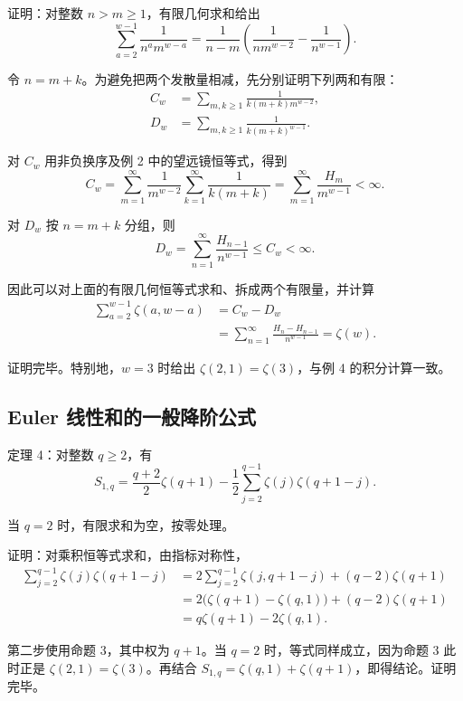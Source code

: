 \documentclass[11pt,a4paper]{article}
\newenvironment{statementblock}{\par\Needspace{9\baselineskip}\noindent}{\par\nopagebreak[4]}
\newenvironment{proofblock}{\par\Needspace{4\baselineskip}\noindent}{\par}
\begin{document}
\begin{proofblock}

证明：对整数 \(n>m\geqslant1\)，有限几何求和给出
\[
\sum_{a=2}^{w-1}\frac1{n^am^{w-a}}
=\frac1{n-m}
\left(\frac1{n m^{w-2}}-\frac1{n^{w-1}}\right).
\]

令 \(n=m+k\)。为避免把两个发散量相减，先分别证明下列两和有限：
\[
\begin{aligned}
C_w&=\sum_{m,k\geqslant1}\frac1{k(m+k)m^{w-2}},\\
D_w&=\sum_{m,k\geqslant1}\frac1{k(m+k)^{w-1}}.
\end{aligned}
\]

对 \(C_w\) 用非负换序及例 2 中的望远镜恒等式，得到
\[
C_w=\sum_{m=1}^{\infty}\frac1{m^{w-2}}
\sum_{k=1}^{\infty}\frac1{k(m+k)}
=\sum_{m=1}^{\infty}\frac{H_m}{m^{w-1}}<\infty.
\]

对 \(D_w\) 按 \(n=m+k\) 分组，则
\[
D_w=\sum_{n=1}^{\infty}\frac{H_{n-1}}{n^{w-1}}
\leqslant C_w<\infty.
\]

因此可以对上面的有限几何恒等式求和、拆成两个有限量，并计算
\[
\begin{aligned}
\sum_{a=2}^{w-1}\zeta(a,w-a)
&=C_w-D_w\\
&=\sum_{n=1}^{\infty}\frac{H_n-H_{n-1}}{n^{w-1}}
=\zeta(w).
\end{aligned}
\]

证明完毕。特别地，\(w=3\) 时给出 \(\zeta(2,1)=\zeta(3)\)，与例 4 的积分计算一致。

\end{proofblock}

\hypertarget{sec-7-3}{%
\subsection{Euler 线性和的一般降阶公式}\label{sec-7-3}}

\begin{statementblock}

定理 4：对整数 \(q\geqslant2\)，有
\[
\boxed{
S_{1,q}
=\frac{q+2}{2}\zeta(q+1)
-\frac12\sum_{j=2}^{q-1}\zeta(j)\zeta(q+1-j)
}.
\]

当 \(q=2\) 时，有限求和为空，按零处理。

\end{statementblock}

\begin{proofblock}

证明：对乘积恒等式求和，由指标对称性，
\[
\begin{aligned}
\sum_{j=2}^{q-1}\zeta(j)\zeta(q+1-j)
&=2\sum_{j=2}^{q-1}\zeta(j,q+1-j)
 +(q-2)\zeta(q+1)\\
&=2\bigl(\zeta(q+1)-\zeta(q,1)\bigr)
 +(q-2)\zeta(q+1)\\
&=q\zeta(q+1)-2\zeta(q,1).
\end{aligned}
\]

第二步使用命题 3，其中权为 \(q+1\)。当 \(q=2\) 时，等式同样成立，因为命题 3 此时正是 \(\zeta(2,1)=\zeta(3)\)。再结合 \(S_{1,q}=\zeta(q,1)+\zeta(q+1)\)，即得结论。证明完毕。

\end{proofblock}
\end{document}
